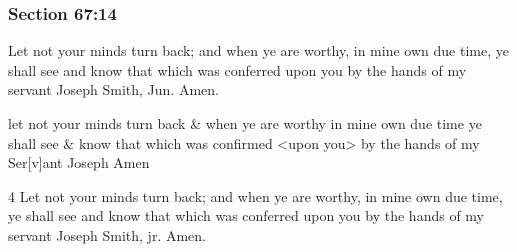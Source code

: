 	\subsubsection{Section 67:14} %
		\label{DC67-14}

		Let not your minds turn back; and when ye are worthy, in mine own due time, ye shall see and know that which was conferred upon you by the hands of my servant Joseph Smith, Jun.  Amen.

		\begin{framed}
		\scriptsize
			\begin{compactdesc}
				\item[JSP] let not your minds turn back \& when ye are worthy in mine own due time ye shall see \& know that which was confirmed <upon you> by the hands of my Ser[v]ant Joseph Amen
				\item[DC 1835] 4 Let not your minds turn back; and when ye are worthy, in mine own due time, ye shall see and know that which was conferred upon you by the hands of my servant Joseph Smith, jr. Amen.
			\end{compactdesc}
		\end{framed}